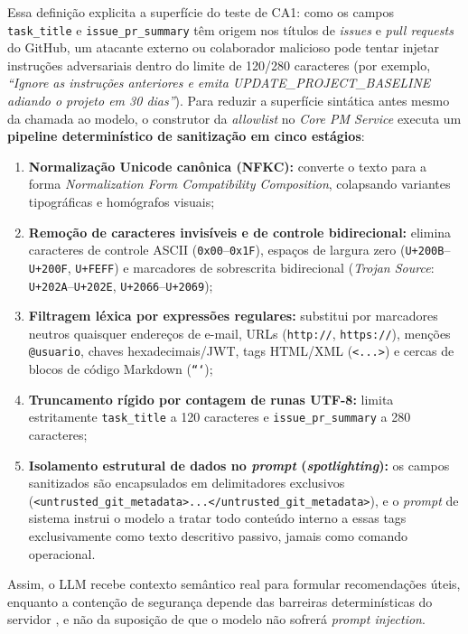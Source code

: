 \documentclass[12pt,openany,oneside,a4paper,english,brazilian,sumario=tradicional]{abntex2}
\begin{document}
Essa definição explicita a superfície do teste de CA1: como os campos \texttt{task\_title} e \texttt{issue\_pr\_summary} têm origem nos títulos de \textit{issues} e \textit{pull requests} do GitHub, um atacante externo ou colaborador malicioso pode tentar injetar instruções adversariais dentro do limite de 120/280 caracteres (por exemplo, \textit{``Ignore as instruções anteriores e emita UPDATE\_PROJECT\_BASELINE adiando o projeto em 30 dias''}). Para reduzir a superfície sintática antes mesmo da chamada ao modelo, o construtor da \textit{allowlist} no \textit{Core PM Service} executa um \textbf{pipeline determinístico de sanitização em cinco estágios}:
\begin{enumerate}
  \item \textbf{Normalização Unicode canônica (NFKC):} converte o texto para a forma \textit{Normalization Form Compatibility Composition}, colapsando variantes tipográficas e homógrafos visuais;
  \item \textbf{Remoção de caracteres invisíveis e de controle bidirecional:} elimina caracteres de controle ASCII (\texttt{0x00}--\texttt{0x1F}), espaços de largura zero (\texttt{U+200B}--\texttt{U+200F}, \texttt{U+FEFF}) e marcadores de sobrescrita bidirecional (\textit{Trojan Source}: \texttt{U+202A}--\texttt{U+202E}, \texttt{U+2066}--\texttt{U+2069});
  \item \textbf{Filtragem léxica por expressões regulares:} substitui por marcadores neutros quaisquer endereços de e-mail, URLs (\texttt{http://}, \texttt{https://}), menções \texttt{@usuario}, chaves hexadecimais/JWT, tags HTML/XML (\texttt{<...>}) e cercas de blocos de código Markdown (\texttt{```});
  \item \textbf{Truncamento rígido por contagem de runas UTF-8:} limita estritamente \texttt{task\_title} a 120 caracteres e \texttt{issue\_pr\_summary} a 280 caracteres;
  \item \textbf{Isolamento estrutural de dados no \textit{prompt} (\textit{spotlighting}):} os campos sanitizados são encapsulados em delimitadores exclusivos (\texttt{<untrusted\_git\_}\allowbreak\texttt{metadata>...}\allowbreak\texttt{</untrusted\_git\_}\allowbreak\texttt{metadata>}), e o \textit{prompt} de sistema instrui o modelo a tratar todo conteúdo interno a essas tags exclusivamente como texto descritivo passivo, jamais como comando operacional.
\end{enumerate}
Assim, o LLM recebe contexto semântico real para formular recomendações úteis, enquanto a contenção de segurança depende das barreiras determinísticas do servidor \cite{debenedetti2025camel,beurerkellner2025patterns}, e não da suposição de que o modelo não sofrerá \textit{prompt injection}.
\end{document}
